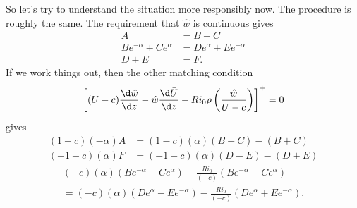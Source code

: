 \documentclass[a4paper]{article}
\begin{document}
So let's try to understand the situation more responsibly now. The procedure is roughly the same. The requirement that $\hat{w}$ is continuous gives
\begin{align*}
  A &= B + C\\
  B e^{-\alpha} + C e^\alpha &= D e^\alpha + E e^{-\alpha}\\
  D + E &= F.
\end{align*}
If we work things out, then the other matching condition
\[
  \left[(\bar{U} - c) \frac{\d \hat{w}}{\d z} - \hat{w} \frac{\d \bar{U}}{\d z} - Ri_0 \bar{\rho} \left(\frac{\hat{w}}{\bar{U} - c}\right)\right]^+_- = 0
\]
gives
\begin{align*}
  (1 - c)(-\alpha) A &= (1 - c)(\alpha) (B - C) - (B + C)\\
  (-1 - c)(\alpha) F &= (-1 - c)(\alpha) (D - E) - (D + E)
\end{align*}
\begin{multline*}
  (-c)(\alpha) (B e^{-\alpha} - C e^\alpha) + \frac{Ri_0}{(-c)} (Be^{-\alpha} + C e^\alpha) \\
  = (-c)(\alpha) (De^\alpha - E e^{-\alpha}) - \frac{Ri_0}{(-c)} (De^\alpha + Ee^{-\alpha}).
\end{multline*}
%
%
%
\end{document}
